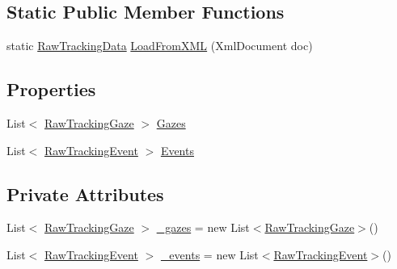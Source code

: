 \subsection*{Static Public Member Functions}
\begin{DoxyCompactItemize}
\item 
static \hyperlink{class_web_analyzer_1_1_models_1_1_base_1_1_raw_tracking_data}{Raw\+Tracking\+Data} \hyperlink{class_web_analyzer_1_1_models_1_1_base_1_1_raw_tracking_data_a9fb7d2281fb635efb2779dc6e502cb9e}{Load\+From\+X\+M\+L} (Xml\+Document doc)
\end{DoxyCompactItemize}
\subsection*{Properties}
\begin{DoxyCompactItemize}
\item 
List$<$ \hyperlink{class_web_analyzer_1_1_models_1_1_base_1_1_raw_tracking_gaze}{Raw\+Tracking\+Gaze} $>$ \hyperlink{class_web_analyzer_1_1_models_1_1_base_1_1_raw_tracking_data_a709969dfa88f800747d1bbabbdfb334e}{Gazes}
\item 
List$<$ \hyperlink{class_web_analyzer_1_1_models_1_1_base_1_1_raw_tracking_event}{Raw\+Tracking\+Event} $>$ \hyperlink{class_web_analyzer_1_1_models_1_1_base_1_1_raw_tracking_data_a288234f675cdfe067ec0667aa2be36c3}{Events}
\end{DoxyCompactItemize}
\subsection*{Private Attributes}
\begin{DoxyCompactItemize}
\item 
List$<$ \hyperlink{class_web_analyzer_1_1_models_1_1_base_1_1_raw_tracking_gaze}{Raw\+Tracking\+Gaze} $>$ \hyperlink{class_web_analyzer_1_1_models_1_1_base_1_1_raw_tracking_data_a74e9bb3eb14735e880cb53a28483538a}{\+\_\+gazes} = new List$<$\hyperlink{class_web_analyzer_1_1_models_1_1_base_1_1_raw_tracking_gaze}{Raw\+Tracking\+Gaze}$>$()
\item 
List$<$ \hyperlink{class_web_analyzer_1_1_models_1_1_base_1_1_raw_tracking_event}{Raw\+Tracking\+Event} $>$ \hyperlink{class_web_analyzer_1_1_models_1_1_base_1_1_raw_tracking_data_ab00b8549401b2116e14913d21c271322}{\+\_\+events} = new List$<$\hyperlink{class_web_analyzer_1_1_models_1_1_base_1_1_raw_tracking_event}{Raw\+Tracking\+Event}$>$()
\end{DoxyCompactItemize}


